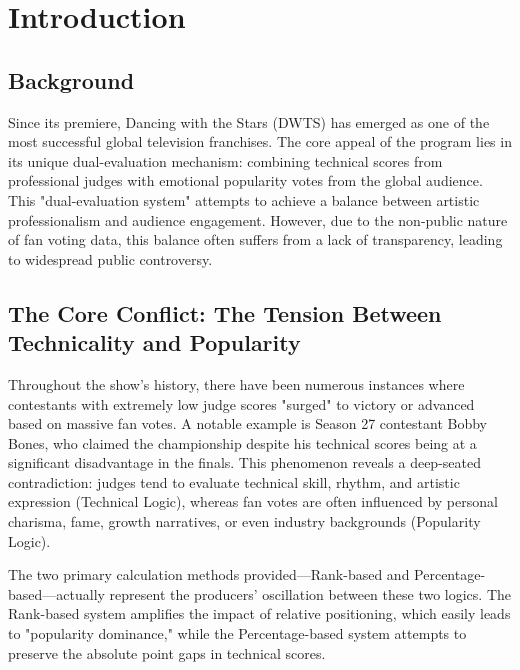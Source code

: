 \documentclass[12pt]{article}
\begin{document}
	\section{Introduction}
	\subsection{Background}
	Since its premiere, Dancing with the Stars (DWTS) has emerged as one of the most successful global television franchises. The core appeal of the program lies in its unique dual-evaluation mechanism: combining technical scores from professional judges with emotional popularity votes from the global audience. This "dual-evaluation system" attempts to achieve a balance between artistic professionalism and audience engagement. However, due to the non-public nature of fan voting data, this balance often suffers from a lack of transparency, leading to widespread public controversy.
	
	\subsection{The Core Conflict: The Tension Between Technicality and Popularity}
	Throughout the show's history, there have been numerous instances where contestants with extremely low judge scores "surged" to victory or advanced based on massive fan votes. A notable example is Season 27 contestant Bobby Bones, who claimed the championship despite his technical scores being at a significant disadvantage in the finals. This phenomenon reveals a deep-seated contradiction: judges tend to evaluate technical skill, rhythm, and artistic expression (Technical Logic), whereas fan votes are often influenced by personal charisma, fame, growth narratives, or even industry backgrounds (Popularity Logic).
	
	The two primary calculation methods provided—Rank-based and Percentage-based—actually represent the producers' oscillation between these two logics. The Rank-based system amplifies the impact of relative positioning, which easily leads to "popularity dominance," while the Percentage-based system attempts to preserve the absolute point gaps in technical scores.
	
\end{document}
